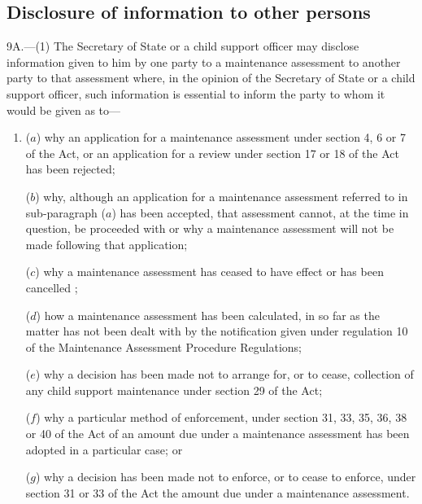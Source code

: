 \documentclass[a4paper,12pt]{article}
\begin{document}
\subsection[9A. Disclosure of information to other persons]{Disclosure of information to other persons}

9A.—(1) The Secretary of State or a child support officer may disclose information given to him by one party to a maintenance assessment to another party to that assessment where, in the opinion of the Secretary of State or a child support officer, such information is essential to inform the party to whom it would be given as to—
\begin{enumerate}\item[]
($a$) why an application for a maintenance assessment under section 4, 6 or 7 of the Act, or an application for a review under section 17 or 18 of the Act has been rejected;

($b$) why, although an application for a maintenance assessment referred to in sub-paragraph ($a$) has been accepted, that assessment cannot, at the time in question, be proceeded with or why a maintenance assessment will not be made following that application;

($c$) why a maintenance assessment has ceased to have effect or has been cancelled%
;


($d$) how a maintenance assessment has been calculated, in so far as the matter has not been dealt with by the notification given under regulation 10 of the Maintenance Assessment Procedure Regulations;

($e$) why a decision has been made not to arrange for, or to cease, collection of any child support maintenance under section 29 of the Act;

($f$) why a particular method of enforcement, under section 31, 33, 35, 36, 38 or 40 of the Act of an amount due under a maintenance assessment has been adopted in a particular case; or

($g$) why a decision has been made not to enforce, or to cease to enforce, under section 31 or 33 of the Act the amount due under a maintenance assessment.
\end{enumerate}
\end{document}
